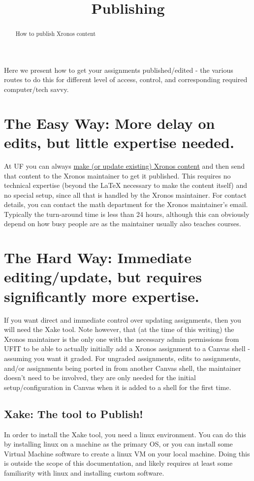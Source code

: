 \documentclass{ximera}
\title{Publishing}
\begin{document}
\begin{abstract}
    How to publish Xronos content
\end{abstract}
\maketitle

Here we present how to get your assignments published/edited - the various routes to do this for different level of access, control, and corresponding required computer/tech savvy.

\section{The Easy Way: More delay on edits, but little expertise needed.}

    At UF you can always \href{https://xronos.clas.ufl.edu/examples/exampleCore/template/overleafTemplate}{make (or update existing) Xronos content} and then send that content to the Xronos maintainer to get it published. This requires no technical expertise (beyond the LaTeX necessary to make the content itself) and no special setup, since all that is handled by the Xronos maintainer. For contact details, you can contact the math department for the Xronos maintainer's email. Typically the turn-around time is less than 24 hours, although this can obviously depend on how busy people are as the maintainer usually also teaches courses.


\section{The Hard Way: Immediate editing/update, but requires significantly more expertise.}

    If you want direct and immediate control over updating assignments, then you will need the Xake tool. Note however, that (at the time of this writing) the Xronos maintainer is the only one with the necessary admin permissions from UFIT to be able to actually initially add a Xronos assignment to a Canvas shell - assuming you want it graded. For ungraded assignments, edits to assignments, and/or assignments being ported in from another Canvas shell, the maintainer doesn't need to be involved, they are only needed for the initial setup/configuration in Canvas when it is added to a shell for the first time.

    \subsection{Xake: The tool to Publish!}
        In order to install the Xake tool, you need a linux environment. You can do this by installing linux on a machine as the primary OS, or you can install some Virtual Machine software to create a linux VM on your local machine. Doing this is outside the scope of this documentation, and likely requires at least some familiarity with linux and installing custom software.
        
\end{document}
